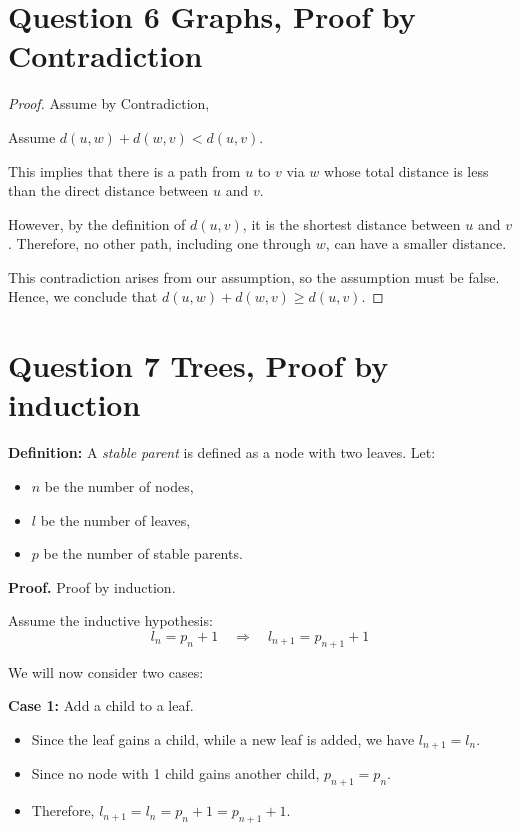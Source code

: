 \documentclass[11pt,fleqn]{article}
\theoremstyle{definition}
\theoremstyle{remark}
\begin{document}
\section{Question 6 Graphs, Proof by Contradiction}
 
    \begin{proof}
        Assume by Contradiction,
        
        Assume \( d(u,w) + d(w,v) < d(u,v) \).
        
        This implies that there is a path from \( u \) to \( v \) via \( w \) whose total distance is less than the direct distance between \( u \) and \( v \).

        However, by the definition of \( d(u,v) \), it is the shortest distance between \( u \) and \( v \). Therefore, no other path, including one through \( w \), can have a smaller distance.

        This contradiction arises from our assumption, so the assumption must be false. Hence, we conclude that \( d(u,w) + d(w,v) \geq d(u,v) \).
    \end{proof}
        
    

\newpage
\clearpage

\section{Question 7 Trees, Proof by induction}
    \textbf{Definition:} A \emph{stable parent} is defined as a node with two leaves. Let:
    \begin{itemize}
        \item \( n \) be the number of nodes,
        \item \( l \) be the number of leaves,
        \item \( p \) be the number of stable parents.
    \end{itemize}

    \noindent \textbf{Proof.} Proof by induction.

    Assume the inductive hypothesis:
    \[
    l_n = p_n + 1 \quad \Rightarrow \quad l_{n+1} = p_{n+1} + 1
    \]

    \noindent We will now consider two cases:

    \textbf{Case 1:} Add a child to a leaf.
    \begin{itemize}
        \item Since the leaf gains a child, while a new leaf is added, we have \( l_{n+1} = l_n \).
        \item Since no node with 1 child gains another child, \( p_{n+1} = p_n \).
        \item Therefore, \( l_{n+1} = l_n = p_n + 1 = p_{n+1} + 1 \).
    \end{itemize}
\end{document}
